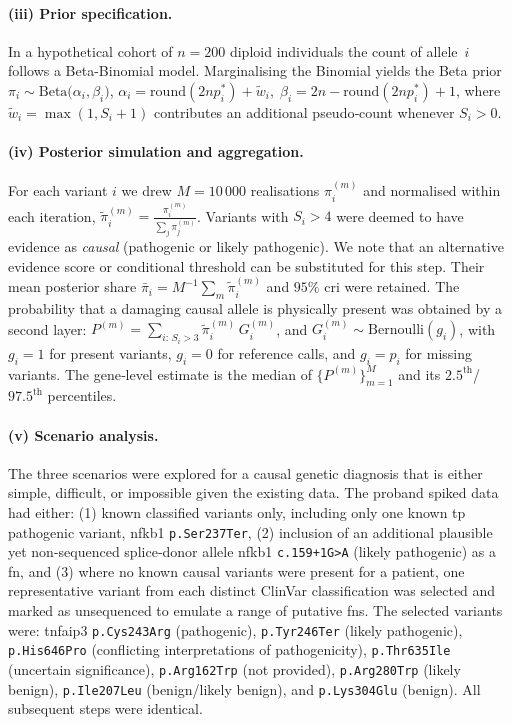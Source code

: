 \paragraph{(iii) Prior specification.}
In a hypothetical cohort of $n=200$ diploid individuals the count of allele~$i$ follows a Beta-Binomial model.  Marginalising the Binomial yields the Beta prior
$\pi_i\sim\mathrm{Beta}\!\bigl(\alpha_i,\beta_i\bigr)$,
$\alpha_i=\mathrm{round}(2np_{i}^{\ast})+\tilde w_i,\;
\beta_i = 2n-\mathrm{round}(2np_{i}^{\ast})+1$,
where $\tilde w_i=\max(1,S_i+1)$ contributes an additional pseudo‑count whenever $S_i>0$.

\paragraph{(iv) Posterior simulation and aggregation.}
For each variant $i$ we drew $M=10\,000$ realisations $\pi_{i}^{(m)}$ and normalised within each iteration,
$\tilde\pi_{i}^{(m)}=\frac{\pi_{i}^{(m)}}{\sum_{j}\pi_{j}^{(m)}}$.
Variants with $S_i>4$ were deemed to have evidence as \emph{causal} (pathogenic or likely pathogenic). 
We note that an alternative evidence score or conditional threshold can be substituted for this step.
Their mean posterior share $\bar\pi_i=M^{-1}\sum_m\tilde\pi_{i}^{(m)}$ and $95\%$ \ac{cri} were retained.  The probability that a damaging causal allele is physically present was obtained by a second layer:
$P^{(m)}=\sum_{i:\,S_i>3}\tilde\pi_{i}^{(m)}\,G_{i}^{(m)}$, and
$G_{i}^{(m)}\sim\mathrm{Bernoulli}(g_i)$,
with $g_i=1$ for present variants, $g_i=0$ for reference calls, and $g_i=p_i$ for missing variants.  The gene‑level estimate is the median of $\{P^{(m)}\}_{m=1}^{M}$ and its $2.5^{\text{th}}$/$97.5^{\text{th}}$ percentiles.

\paragraph{(v) Scenario analysis.}
The three scenarios were explored for a causal genetic diagnosis that is either simple, difficult, or impossible given the existing data.
The proband spiked data had either:
(1) known classified variants only, including only one known \ac{tp} pathogenic variant, \ac{nfkb1}  \texttt{p.Ser237Ter}, 
(2) inclusion of an additional plausible yet non-sequenced splice‑donor allele \ac{nfkb1}  \texttt{c.159+1G{\small\textgreater}A} (likely pathogenic) as a \ac{fn}, and 
(3) where no known causal variants were present for a patient, one representative variant from each distinct ClinVar classification was selected and marked as unsequenced to emulate a range of putative \acp{fn}. The selected variants were: \ac{tnfaip3} \texttt{p.Cys243Arg} (pathogenic), \texttt{p.Tyr246Ter} (likely pathogenic), \texttt{p.His646Pro} (conflicting interpretations of pathogenicity), \texttt{p.Thr635Ile} (uncertain significance), \texttt{p.Arg162Trp} (not provided), \texttt{p.Arg280Trp} (likely benign), \texttt{p.Ile207Leu} (benign/likely benign), and \texttt{p.Lys304Glu} (benign). 
All subsequent steps were identical.

